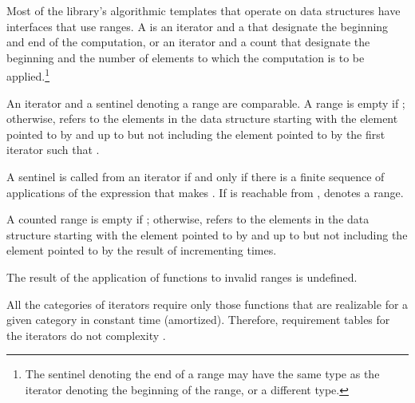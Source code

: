 \begin{addedblock}
\pnum
Most of the library's algorithmic templates that operate on data structures have
interfaces that use ranges. A  is an iterator and a 
that designate the beginning and end of the computation, or an iterator and a
count that designate the beginning and the number of elements to which the
computation is to be applied.\footnote{The sentinel denoting the end of a range
may have the same type as the iterator denoting the beginning of the range, or a
different type.}

\pnum
An iterator and a sentinel denoting a range are comparable.
A range 
is empty if ;
otherwise, 
refers to the elements in the data structure starting with the element
pointed to by
and up to but not including the element pointed to by
the first iterator  such that .

\pnum
A sentinel  is called  from an iterator  if
and only if there is a finite sequence of applications of the expression
 that makes . If  is reachable from ,
 denotes a  range.

\pnum
A counted range  is empty if ; otherwise, 
refers to the  elements in the data structure starting with the element
pointed to by  and up to but not including the element pointed to by
the result of incrementing   times. 

\pnum
{} The result of the application of  functions  to invalid
ranges is undefined.
\end{addedblock}

\pnum
All the categories of iterators require only those functions
that are realizable for a given category in constant time (amortized).
Therefore, requirement tables  for the iterators
do not   complexity .

